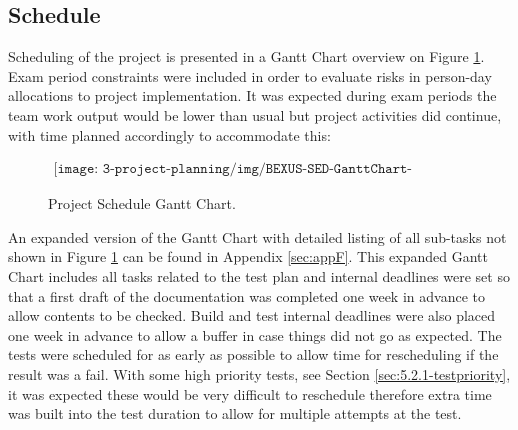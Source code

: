 \subsection{Schedule}

Scheduling of the project is presented in a Gantt Chart overview on Figure \ref{fig:schedule-gantt-chart}. Exam period constraints were included in order to evaluate risks in person-day allocations to project implementation. It was expected during exam periods the team work output would be lower than usual but project activities did continue, with time planned accordingly to accommodate this:

\begin{figure}[H]
    \begin{align*}
        \texttt{[image: 3-project-planning/img/BEXUS-SED-GanttChart-Overview.png]}
    \end{align*}
    \caption{Project Schedule Gantt Chart.}\label{fig:schedule-gantt-chart}
\end{figure}

An expanded version of the Gantt Chart with detailed listing of all sub-tasks not shown in Figure \ref{fig:schedule-gantt-chart} can be found in Appendix \ref{sec:appF}. This expanded Gantt Chart includes all tasks related to the test plan and internal deadlines were set so that a first draft of the documentation was completed one week in advance to allow contents to be checked. Build and test internal deadlines were also placed one week in advance to allow a buffer in case things did not go as expected. The tests were scheduled for as early as possible to allow time for rescheduling if the result was a fail. With some high priority tests, see Section \ref{sec:5.2.1-testpriority}, it was expected these would be very difficult to reschedule therefore extra time was built into the test duration to allow for multiple attempts at the test.

